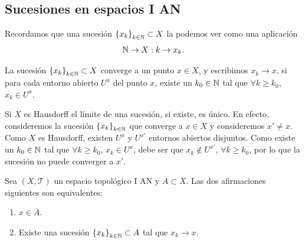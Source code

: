 \subsection{Sucesiones en espacios I AN}
Recordamos que una sucesión $\displaystyle \left\{ x_{k}\right\} _{k \in \mathbb{N}}\subset X $ la podemos ver como una aplicación
\[ \mathbb{N} \to X : k \to x_{k} .\]
\begin{definition}
	La sucesión $\displaystyle \left\{ x_{k}\right\} _{k \in \mathbb{N}}\subset X $ converge a un punto $\displaystyle x \in X $, y escribimos $\displaystyle x_{k}\to x $, si para cada entorno abierto $\displaystyle U^{x} $ del punto $\displaystyle x $, existe un $\displaystyle k_{0}\in \mathbb{N} $ tal que $\displaystyle \forall k \geq k_{0} $, $\displaystyle x_{k}\in U^{x} $. 
\end{definition}
\begin{observation}
	Si $\displaystyle X $ es Hausdorff el límite de una sucesión, si existe, es único. En efecto, consideremos la sucesión $\displaystyle \left\{ x_{k}\right\} _{k \in \mathbb{N}} $ que converge a $\displaystyle x \in X $ y consideremos $\displaystyle x' \neq x $. Como $\displaystyle X $ es Hausdorff, existen $\displaystyle U^{x} $ y $\displaystyle U^{x'} $ entornos abiertos disjuntos. Como existe un $\displaystyle k_{0} \in \mathbb{N} $ tal que $\displaystyle \forall k \geq k_{0} $, $\displaystyle x_{k}\in U^{x} $, debe ser que $\displaystyle x_{k}\not\in U^{x'} $, $\displaystyle \forall k \geq k_{0} $, por lo que la sucesión no puede converger a $\displaystyle x' $. 
\end{observation}
\begin{prop}
Sea $\displaystyle \left(X, \mathcal{T}\right) $ un espacio topológico I AN y $\displaystyle A \subset X $. Las dos afirmaciones siguientes son equivalentes:
\begin{enumerate}
\item $\displaystyle x \in \overline{A} $.
\item Existe una sucesión $\displaystyle \left\{ x_{k}\right\} _{k\in \mathbb{N}}\subset A $ tal que $\displaystyle x_{k}\to x $.
\end{enumerate}
\end{prop}
